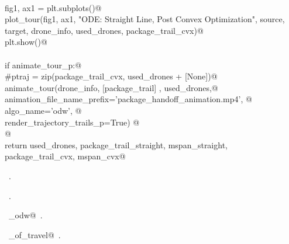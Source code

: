 \documentclass[10.0pt]{report}
\begin{document}
\begin{flushleft}
\begin{list}{}{}
\mbox{}\verb@@\\
\mbox{}\verb@         fig1, ax1 = plt.subplots()@\\
\mbox{}\verb@         plot_tour(fig1, ax1, "ODE: Straight Line, Post Convex Optimization", source, target, drone_info, used_drones, package_trail_cvx)@\\
\mbox{}\verb@         plt.show()@\\
\mbox{}\verb@@\\
\mbox{}\verb@    if animate_tour_p:@\\
\mbox{}\verb@        #ptraj  = zip(package_trail_cvx, used_drones + [None])@\\
\mbox{}\verb@        animate_tour(drone_info, [package_trail] , used_drones,@\\
\mbox{}\verb@                     animation_file_name_prefix='package_handoff_animation.mp4', @\\
\mbox{}\verb@                     algo_name='odw',  @\\
\mbox{}\verb@                     render_trajectory_trails_p=True) @\\
\mbox{}\verb@    @\\
\mbox{}\verb@    return used_drones, package_trail_straight, mspan_straight, package_trail_cvx, mspan_cvx@\\
\mbox{}\verb@@{\NWsep}
\end{list}
\vspace{-1.5ex}
\footnotesize
\begin{list}{}{\setlength{\itemsep}{-\parsep}\setlength{\itemindent}{-\leftmargin}}
\item \NWtxtMacroDefBy\ .
\item \NWtxtMacroRefIn\ .
\item \NWtxtIdentsDefed\nobreak\  \verb@algo_odw@\nobreak\ .\item \NWtxtIdentsUsed\nobreak\  \verb@time_of_travel@\nobreak\ .
\item{}
\end{list}
\vspace{4ex}
\end{flushleft}

 
\end{document}
